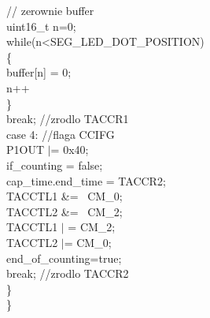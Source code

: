\documentclass[a4paper,titlepage,11pt,floatssmall]{mwrep}
\begin{document}
			// zerownie buffer\\
			uint16\_{}t n=0;\\
			while(n<SEG\_{}LED\_{}DOT\_{}POSITION)\\
			\{\\
				buffer[n] = 0;\\
				n++\\
			\}\\

            break; //zrodlo TACCR1\\

        case 4: //flaga CCIFG\\
            P1OUT $\vert$= 0x40;\\
        	if\_{}counting = false;\\
            cap\_{}time.end\_{}time = TACCR2;\\

            TACCTL1 \&= ~CM\_{}0;\\
            TACCTL2 \&= ~CM\_{}2;\\
            TACCTL1 $\vert$ = CM\_{}2;\\
            TACCTL2 $\vert$= CM\_{}0;\\


			end\_{}of\_{}counting=true;\\
            break; //zrodlo TACCR2\\
    \}\\
\}\\
       
\end{document}

